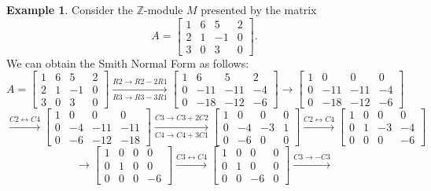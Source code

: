 \documentclass[12pt]{report}
\numberwithin{equation}{section}
\numberwithin{theorem}{chapter}
\theoremstyle{definition}
\newtheorem{example}[theorem]{Example}
\newtheorem*{basic properties}{Basic Properties}
\newtheorem*{Important Remark}{Important Remark}
\begin{document}
\begin{example}
Consider the $\mathbb{Z}$-module $M$ presented by the matrix
$$A=\begin{bmatrix}
1 & 6 & 5 & 2 \\
2 & 1 & -1 & 0 \\
3 & 0 & 3 & 0
\end{bmatrix}.$$
We can obtain the Smith Normal Form as follows:
$$A=\begin{bmatrix}
1 & 6 & 5 & 2 \\
2 & 1 & -1 & 0 \\
3 & 0 & 3 & 0
\end{bmatrix} \xrightarrow[R3 \to R3-3R1]{R2 \to R2-2R1}
\begin{bmatrix}
1 & 6 & 5 & 2 \\
0 & -11 & -11 & -4 \\
0 & -18 & -12 & -6
\end{bmatrix} \rightarrow 
\begin{bmatrix}
1 & 0 & 0  & 0 \\
0 & -11 & -11 & -4 \\
0 & -18 & -12 & -6
\end{bmatrix}$$
$$\xrightarrow{C2 \leftrightarrow C4}
\begin{bmatrix}
1 & 0 & 0  & 0 \\
0 & -4 & -11 & -11 \\
0 & -6 & -12 & -18
\end{bmatrix}
\xrightarrow[C4 \to C4 + 3C1]{C3 \to C3+2C2}
\begin{bmatrix}
1 & 0 & 0  & 0 \\
0 & -4 & -3 & 1 \\
0 & -6 & 0 & 0
\end{bmatrix}
\xrightarrow{C2 \leftrightarrow C4}
\begin{bmatrix}
1 & 0 & 0  & 0 \\
0 & 1 & -3 & -4 \\
0 & 0 & 0 & -6
\end{bmatrix}$$
$$\rightarrow
\begin{bmatrix}
1 & 0 & 0  & 0 \\
0 & 1 & 0 & 0\\
0 & 0 & 0 & -6
\end{bmatrix}
\xrightarrow{C3 \leftrightarrow C4}
\begin{bmatrix}
1 & 0 & 0  & 0 \\
0 & 1 & 0 & 0\\
0 & 0 & -6 & 0
\end{bmatrix}
\xrightarrow{C3 \to -C3}
$$
\end{example}
\end{document}
